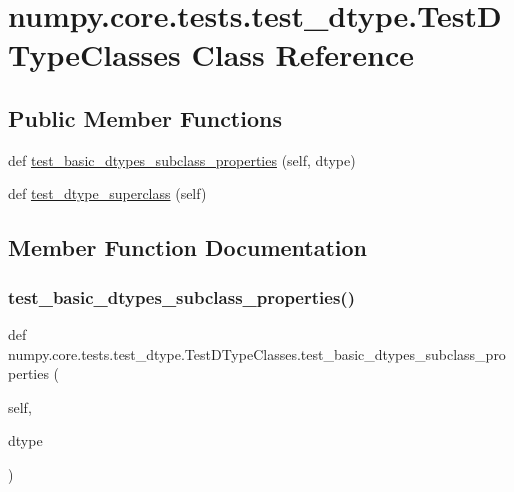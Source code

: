 \hypertarget{classnumpy_1_1core_1_1tests_1_1test__dtype_1_1TestDTypeClasses}{}\section{numpy.\+core.\+tests.\+test\+\_\+dtype.\+Test\+D\+Type\+Classes Class Reference}
\label{classnumpy_1_1core_1_1tests_1_1test__dtype_1_1TestDTypeClasses}
\subsection*{Public Member Functions}
\begin{DoxyCompactItemize}
\item 
def \hyperlink{classnumpy_1_1core_1_1tests_1_1test__dtype_1_1TestDTypeClasses_ab69d9d34ea56c2d3749d7ef04b291e2f}{test\+\_\+basic\+\_\+dtypes\+\_\+subclass\+\_\+properties} (self, dtype)
\item 
def \hyperlink{classnumpy_1_1core_1_1tests_1_1test__dtype_1_1TestDTypeClasses_a3bb615b326486911ab95141532d65f76}{test\+\_\+dtype\+\_\+superclass} (self)
\end{DoxyCompactItemize}


\subsection{Member Function Documentation}
\mbox{\label{classnumpy_1_1core_1_1tests_1_1test__dtype_1_1TestDTypeClasses_ab69d9d34ea56c2d3749d7ef04b291e2f}} 
\subsubsection{\texorpdfstring{test\+\_\+basic\+\_\+dtypes\+\_\+subclass\+\_\+properties()}{test\_basic\_dtypes\_subclass\_properties()}}
{\footnotesize\ttfamily def numpy.\+core.\+tests.\+test\+\_\+dtype.\+Test\+D\+Type\+Classes.\+test\+\_\+basic\+\_\+dtypes\+\_\+subclass\+\_\+properties (\begin{DoxyParamCaption}\item[{}]{self,  }\item[{}]{dtype }\end{DoxyParamCaption})}

